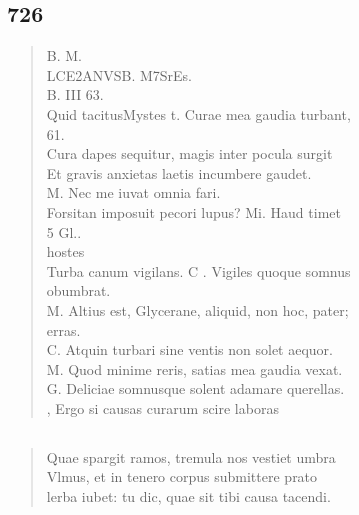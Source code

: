 \documentclass[11pt, a4paper]{report}
\begin{document}
            \subsection*{726}
      \begin{verse}
      B. M. \\ LCE2ANVSB. M7SrEs. \\ B. III 63. \\ Quid tacitusMystes t. Curae mea gaudia turbant, \\ 61. \\ Cura dapes sequitur, magis inter pocula surgit \\ Et gravis anxietas laetis incumbere gaudet. \\ M. Nec me iuvat omnia fari. \\ Forsitan imposuit pecori lupus? Mi. Haud timet \\ 5 Gl.. \\ hostes \\ Turba canum vigilans. C . Vigiles quoque somnus \\ obumbrat. \\ M. Altius est, Glycerane, aliquid, non hoc, pater; \\ erras. \\ C. Atquin turbari sine ventis non solet aequor. \\ M. Quod minime reris, satias mea gaudia vexat. \\ G. Deliciae somnusque solent adamare querellas. \\  \lbrack , Ergo si causas curarum scire laboras \\ 
      \end{verse}
  
            \subsection*{}
      \begin{verse}
      Quae spargit ramos, tremula nos vestiet umbra \\ Vlmus, et in tenero corpus submittere prato \\ lerba iubet: tu dic, quae sit tibi causa tacendi. \\ 
      \end{verse}
  
\end{document}
